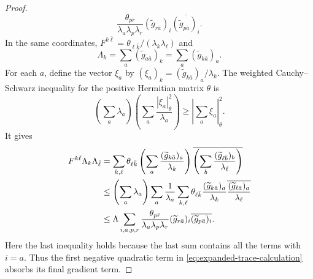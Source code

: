 \documentclass[reqno]{amsart}
\theoremstyle{plain}
\theoremstyle{remark}
\begin{document}
\begin{proof}
\[ \frac{\theta_{p\bar r}}{\lambda_a\lambda_p\lambda_r}
 (\widetilde g_{r\bar a})_i
 \overline{(\widetilde g_{p\bar a})_i}.
\]
In the same coordinates,
$F^{k\bar\ell}=\theta_{\ell\bar k}/(\lambda_k\lambda_\ell)$ and
\[
 \Lambda_k=\sum_a(\widetilde g_{a\bar a})_k
 =\sum_a(\widetilde g_{k\bar a})_a.
\]
For each $a$, define the vector $\xi_a$ by
$(\xi_a)_k=(\widetilde g_{k\bar a})_a/\lambda_k$. The weighted
Cauchy--Schwarz inequality for the positive Hermitian matrix $\theta$
is
\[
 \left(\sum_a\lambda_a\right)
 \left(\sum_a\frac{|\xi_a|_\theta^2}{\lambda_a}\right)
 \geq\left|\sum_a\xi_a\right|_\theta^2.
\]
It gives
\begin{align}
 F^{k\bar\ell}\Lambda_k\Lambda_{\bar\ell}
 &=\sum_{k,\ell}\theta_{\ell\bar k}
 \left(\sum_a\frac{(\widetilde g_{k\bar a})_a}{\lambda_k}\right)
 \overline{\left(\sum_b
 \frac{(\widetilde g_{\ell\bar b})_b}{\lambda_\ell}\right)}
 \notag\\
 &\leq\left(\sum_a\lambda_a\right)
 \sum_a\frac1{\lambda_a}\sum_{k,\ell}
 \theta_{\ell\bar k}
 \frac{(\widetilde g_{k\bar a})_a}{\lambda_k}
 \overline{\frac{(\widetilde g_{\ell\bar a})_a}{\lambda_\ell}}
 \notag\\
 &\leq\Lambda\sum_{i,a,p,r}
 \frac{\theta_{p\bar r}}{\lambda_a\lambda_p\lambda_r}
 (\widetilde g_{r\bar a})_i
 \overline{(\widetilde g_{p\bar a})_i}.
\label{eq:trace-gradient-CS}
\end{align}
Here the last inequality holds because the
last sum contains all the terms with $i=a$.  Thus the first negative
quadratic term in \eqref{eq:expanded-trace-calculation} absorbs its
final gradient term.


\end{proof}
\end{document}
